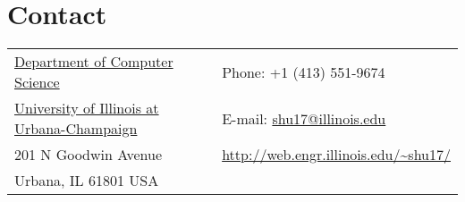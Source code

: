 \section{\sc Contact}
\vspace{.01in}
\begin{tabular}{@{}p{3.6in}p{4in}}
{\href{http://www.cs.illinois.edu/}{Department of Computer Science}}           & {Phone:}  +1 (413) 551-9674 \\
{\href{http://www.illinois.edu/}{University of Illinois at Urbana-Champaign}}  & {E-mail:} {\href{mailto:shu17@illinois.edu}{shu17@illinois.edu}}\\
201 N Goodwin Avenue                                                           & {\url{http://web.engr.illinois.edu/~shu17/}}\\
Urbana, IL 61801 USA\\
\end{tabular}



